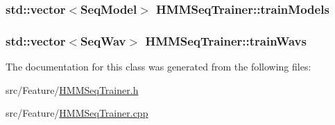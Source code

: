 \hypertarget{class_h_m_m_seq_trainer_ac8e9e38eaab0a2d2bbb7e4770edc2c60}{
\subsubsection[{train\+Models}]{\setlength{\rightskip}{0pt plus 5cm}std\+::vector$<${\bf Seq\+Model}$>$ H\+M\+M\+Seq\+Trainer\+::train\+Models\hspace{0.3cm}{\ttfamily [protected]}}}\label{class_h_m_m_seq_trainer_ac8e9e38eaab0a2d2bbb7e4770edc2c60}
\hypertarget{class_h_m_m_seq_trainer_a290cfb899d17941cb6aba292f1a36e13}{
\subsubsection[{train\+Wavs}]{\setlength{\rightskip}{0pt plus 5cm}std\+::vector$<${\bf Seq\+Wav}$>$ H\+M\+M\+Seq\+Trainer\+::train\+Wavs\hspace{0.3cm}{\ttfamily [protected]}}}\label{class_h_m_m_seq_trainer_a290cfb899d17941cb6aba292f1a36e13}


The documentation for this class was generated from the following files\+:\begin{DoxyCompactItemize}
\item 
src/\+Feature/\hyperlink{_h_m_m_seq_trainer_8h}{H\+M\+M\+Seq\+Trainer.\+h}\item 
src/\+Feature/\hyperlink{_h_m_m_seq_trainer_8cpp}{H\+M\+M\+Seq\+Trainer.\+cpp}\end{DoxyCompactItemize}
